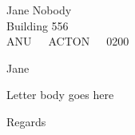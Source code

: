 \documentclass[a4paper,12pt]{letter}
\begin{document}
\address{Joe Bloggs \\ Building 555 \\ ANU\ \ \ ACTON\ \ \ 0200}
\signature{Joe Bloggs}
\begin{letter}{Jane Nobody \\  Building 556 \\ ANU\ \ \ ACTON\ \ \ 0200}
\opening{Jane}

Letter body goes here

\closing{Regards}
\end{letter}
\end{document}
